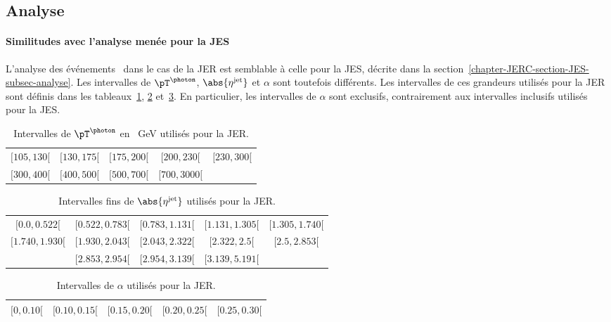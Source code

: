 \subsection{Analyse}\label{chapter-JERC-section-JER-subsec-analyse}
\paragraph{Similitudes avec l'analyse menée pour la JES}
L'analyse des événements \Gjets\ dans le cas de la JER est semblable à celle pour la JES, décrite dans la section~\ref{chapter-JERC-section-JES-subsec-analyse}.
Les intervalles de $\pT^{\photon}$, $\abs{\eta^\text{jet}}$ et $\alpha$ sont toutefois différents.
Les intervalles de ces grandeurs utilisés pour la JER sont définis dans les tableaux~\ref{tab-pT_photon_intervalles-JER}, \ref{tab-eta_jet_intervalles_fin-JER} et~\ref{tab-alpha_intervalles-JER}.
En particulier, les intervalles de $\alpha$ sont exclusifs, contrairement aux intervalles inclusifs utilisés pour la JES.
\begin{table}[h]
\centering
\begin{tabular}{ccccc}
\toprule
$[\num{105}, \num{130}[$ & $[\num{130}, \num{175}[$ & $[\num{175}, \num{200}[$ & $[\num{200}, \num{230}[$ & $[\num{230}, \num{300}[$ \\
$[\num{300}, \num{400}[$ & $[\num{400}, \num{500}[$ & $[\num{500}, \num{700}[$ & $[\num{700}, \num{3000}[$ \\
\bottomrule
\end{tabular}
\caption[Intervalles de $\pT^{\photon}$ utilisés pour la JER.]{Intervalles de $\pT^{\photon}$ en \SI{}{\GeV} utilisés pour la JER.}
\label{tab-pT_photon_intervalles-JER}
\end{table}
\begin{table}[h]
\centering
\begin{tabular}{ccccc}
\toprule
$[\num{0.0}, \num{0.522}[$ & $[\num{0.522}, \num{0.783}[$ & $[\num{0.783}, \num{1.131}[$ & $[\num{1.131}, \num{1.305}[$ & $[\num{1.305}, \num{1.740}[$ \\
$[\num{1.740}, \num{1.930}[$ & $[\num{1.930}, \num{2.043}[$ & $[\num{2.043}, \num{2.322}[$ & $[\num{2.322}, \num{2.5}[$ & $[\num{2.5}, \num{2.853}[$ \\
 & $[\num{2.853}, \num{2.954}[$ & $[\num{2.954}, \num{3.139}[$ & $[\num{3.139}, \num{5.191}[$ &  \\
\bottomrule
\end{tabular}
\caption{Intervalles fins de $\abs{\eta^\text{jet}}$ utilisés pour la JER.}
\label{tab-eta_jet_intervalles_fin-JER}
\end{table}
\begin{table}[h]
\centering
\begin{tabular}{ccccc}
\toprule
$[\num{0}, \num{0.10}[$ & $[\num{0.10}, \num{0.15}[$ & $[\num{0.15}, \num{0.20}[$ & $[\num{0.20}, \num{0.25}[$ & $[\num{0.25}, \num{0.30}[$ \\
\bottomrule
\end{tabular}
\caption{Intervalles de $\alpha$ utilisés pour la JER.}
\label{tab-alpha_intervalles-JER}
\end{table}
